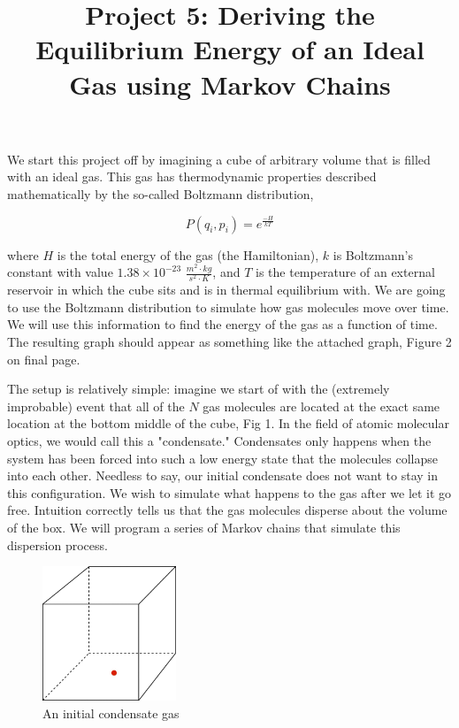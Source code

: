 \documentclass[11pt]{amsart}
\title{Project 5: Deriving the Equilibrium Energy of an Ideal Gas using Markov Chains}
\begin{document}
\maketitle

We start this project off by imagining a cube of arbitrary volume that is filled with an ideal gas.  This gas has thermodynamic properties described mathematically by the so-called Boltzmann distribution, 

\begin{equation}
P(q_i,p_i)=e^{\frac{-H}{kT}}
\end{equation}
\vspace{2 mm}

where $H$ is the total energy of the gas (the Hamiltonian), $k$ is Boltzmann's constant with value $1.38 \times 10^{-23}$ $\frac{m^2 \cdot kg}{s^2 \cdot K}$, and $T$ is the temperature of an external reservoir in which the cube sits and is in thermal equilibrium with.  We are going to use the Boltzmann distribution to simulate how gas molecules move over time.  We will use this information to find the energy of the gas as a function of time.  The resulting graph should appear as something like the attached graph, Figure 2 on final page.
\newline

The setup is relatively simple: imagine we start of with the (extremely improbable) event that all of the $N$ gas molecules are located at the exact same location at the bottom middle of the cube, Fig 1.  In the field of atomic molecular optics, we would call this a "condensate."  Condensates only happens when the system has been forced into such a low energy state that the molecules collapse into each other.  Needless to say, our initial condensate does not want to stay in this configuration.  We wish to simulate what happens to the gas after we let it go free.  Intuition correctly tells us that the gas molecules disperse about the volume of the box.  We will program a series of Markov chains that simulate this dispersion process.
\newline

\begin{figure}[ht!]
\centering
\includegraphics[width=40mm]{cube.jpg}
\caption{An initial condensate gas}
\label{overflow}
\end{figure}
\end{document}
